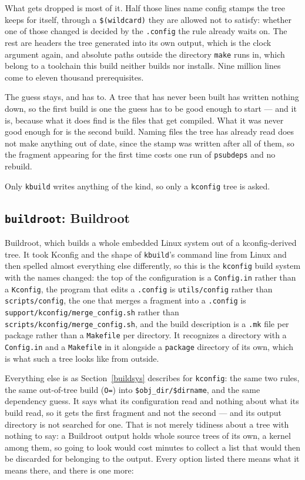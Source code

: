 \documentclass{article}
\begin{document}
What gets dropped is most of it.  Half those lines name config stamps
the tree keeps for itself, through a \texttt{\$(wildcard)} they are
allowed not to satisfy: whether one of those changed is decided by the
\texttt{.config} the rule already waits on.  The rest are headers the
tree generated into its own output, which is the clock argument again,
and absolute paths outside the directory \texttt{make} runs in, which
belong to a toolchain this build neither builds nor installs.  Nine
million lines come to eleven thousand prerequisites.

The guess stays, and has to.  A tree that has never been built has
written nothing down, so the first build is one the guess has to be
good enough to start --- and it is, because what it does find is the
files that get compiled.  What it was never good enough for is the
second build.  Naming files the tree has already read does not make
anything out of date, since the stamp was written after all of them,
so the fragment appearing for the first time costs one run of
\texttt{psubdeps} and no rebuild.

Only \texttt{kbuild} writes anything of the kind, so only a
\texttt{kconfig} tree is asked.

\subsection{\texttt{buildroot}: Buildroot \label{buildsys:buildroot}}

Buildroot, which builds a whole embedded Linux system out of a
kconfig-derived tree.  It took Kconfig and the shape of
\texttt{kbuild}'s command line from Linux and then spelled almost
everything else differently, so this is the \texttt{kconfig} build
system with the names changed: the top of the configuration is a
\texttt{Config.in} rather than a \texttt{Kconfig}, the program that
edits a \texttt{.config} is \texttt{utils/config} rather than
\texttt{scripts/config}, the one that merges a fragment into a
\texttt{.config} is \texttt{support/kconfig/merge\_config.sh} rather
than \texttt{scripts/kconfig/merge\_config.sh}, and the build
description is a \texttt{.mk} file per package rather than a
\texttt{Makefile} per directory.  It recognizes a directory with a \texttt{Config.in} and a
\texttt{Makefile} in it alongside a \texttt{package} directory of
its own, which is what such a tree looks like from outside.

Everything else is as Section~\ref{buildsys} describes for
\texttt{kconfig}: the same two rules, the same out-of-tree build
(\texttt{O=}) into \texttt{\$obj\_dir/\$dirname}, and the
same dependency guess.  It says what its configuration read and
nothing about what its build read, so it gets the first fragment and
not the second --- and its output directory is not searched for one.
That is not merely tidiness about a tree with nothing to say: a
Buildroot output holds whole source trees of its own, a kernel among
them, so going to look would cost minutes to collect a list that would
then be discarded for belonging to the output.  Every option listed there means what it means
there, and there is one more:
\end{document}
